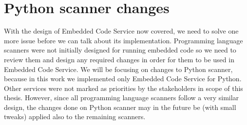\section{Python scanner changes}

With the design of Embedded Code Service now covered, we need to solve one more issue before we can talk about its implementation. Programming language scanners were not initially designed for running embedded code so we need to review them and design any required changes in order for them to be used in Embedded Code Service. We will be focusing on changes to Python scanner, because in this work we implemented only Embedded Code Service for Python. Other services were not marked as priorities by the stakeholders in scope of this thesis. However, since all programming language scanners follow a very similar design, the changes done on Python scanner may in the future be (with small tweaks) applied also to the remaining scanners.

